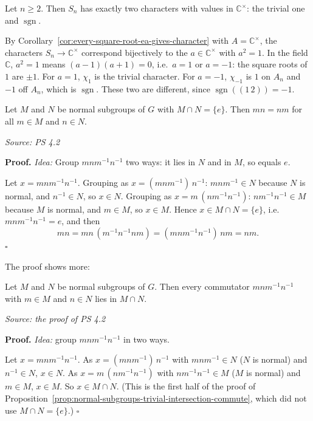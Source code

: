 \documentclass[11pt]{report}
\newcommand{\sgn}{\operatorname{sgn}}
\renewenvironment{proof}[1][Proof]{\noindent\textbf{#1.} }{\hfill$\square$\par\vspace{5pt}}
\newcommand{\srcline}[1]{\par\hfill{\footnotesize\textit{Source: #1}}}
\begin{document}
\begin{exbox}\label{ex:characters-sn-complex-values}
Let $n \geq 2$. Then $S_n$ has exactly two characters with values in $\mathbb{C}^\times$: the trivial one and $\sgn$.

By Corollary~\ref{cor:every-square-root-ea-gives-character} with $A = \mathbb{C}^\times$, the characters $S_n \to \mathbb{C}^\times$ correspond bijectively to the $a \in \mathbb{C}^\times$ with $a^2 = 1$. In the field $\mathbb{C}$, $a^2 = 1$ means $(a - 1)(a + 1) = 0$, i.e.\ $a = 1$ or $a = -1$: the square roots of $1$ are $\pm 1$. For $a = 1$, $\chi_1$ is the trivial character. For $a = -1$, $\chi_{-1}$ is $1$ on $A_n$ and $-1$ off $A_n$, which is $\sgn$. These two are different, since $\sgn((1\,2)) = -1$.
\end{exbox}

\begin{propbox}\label{prop:normal-subgroups-trivial-intersection-commute}
Let $M$ and $N$ be normal subgroups of $G$ with $M \cap N = \{e\}$. Then $mn = nm$ for all $m \in M$ and $n \in N$.
\srcline{PS 4.2}
\end{propbox}

\begin{proof}
\textit{Idea:} Group $mnm^{-1}n^{-1}$ two ways: it lies in $N$ and in $M$, so equals $e$.\par
Let $x = mnm^{-1}n^{-1}$. Grouping as $x = (mnm^{-1})\,n^{-1}$: $mnm^{-1} \in N$ because $N$ is normal, and $n^{-1} \in N$, so $x \in N$. Grouping as $x = m\,(nm^{-1}n^{-1})$: $nm^{-1}n^{-1} \in M$ because $M$ is normal, and $m \in M$, so $x \in M$. Hence $x \in M \cap N = \{e\}$, i.e.\ $mnm^{-1}n^{-1} = e$, and then
\[ mn = mn\,(m^{-1}n^{-1}nm) = (mnm^{-1}n^{-1})\,nm = nm. \]
\end{proof}

The proof shows more:

\begin{lembox}\label{lem:commutators-two-normal-subgroups}
Let $M$ and $N$ be normal subgroups of $G$. Then every commutator $mnm^{-1}n^{-1}$ with $m \in M$ and $n \in N$ lies in $M \cap N$.
\srcline{the proof of PS 4.2}
\end{lembox}

\begin{proof}
\textit{Idea:} group $mnm^{-1}n^{-1}$ in two ways.\par
Let $x = mnm^{-1}n^{-1}$. As $x = (mnm^{-1})\,n^{-1}$ with $mnm^{-1} \in N$ ($N$ is normal) and $n^{-1} \in N$, $x \in N$. As $x = m\,(nm^{-1}n^{-1})$ with $nm^{-1}n^{-1} \in M$ ($M$ is normal) and $m \in M$, $x \in M$. So $x \in M \cap N$. (This is the first half of the proof of Proposition~\ref{prop:normal-subgroups-trivial-intersection-commute}, which did not use $M \cap N = \{e\}$.)
\end{proof}
\end{document}
